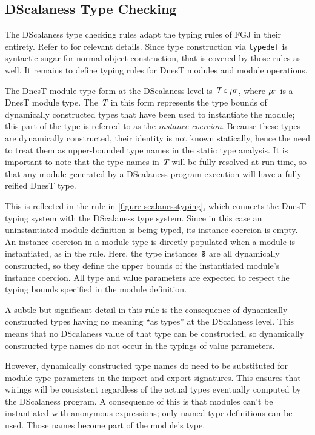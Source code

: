 \subsection{DScalaness Type Checking}
\label{section-scalaness-typing}

\scalanesstypingfig

The DScalaness type checking rules adapt the typing rules of FGJ in their entirety. Refer to
\cite{FJ} for relevant details. Since type construction via \texttt{typedef} is syntactic sugar
for normal object construction, that is covered by those rules as well. It remains to define
typing rules for DnesT modules and module operations.

The DnesT module type form at the DScalaness level is $\textit{T} \circ \mu\!\tau$, where
$\mu\!\tau$ is a DnesT module type. The $\textit{T}$ in this form represents the type bounds of
dynamically constructed types that have been used to instantiate the module; this part of the
type is referred to as the \emph{instance coercion}. Because these types are dynamically
constructed, their identity is not known statically, hence the need to treat them as
upper-bounded type names in the static type analysis. It is important to note that the type
names in $\textit{T}$ will be fully resolved at run time, so that any module generated by a
DScalaness program execution will have a fully reified DnesT type.

This is reflected in the  rule in \autoref{figure-scalanesstyping}, which connects
the DnesT typing system with the DScalaness type system. Since in this case an uninstantiated
module definition is being typed, its instance coercion is empty. An instance coercion in a
module type is directly populated when a module is instantiated, as in the 
rule. Here, the type instances ${\mathtt{\bar{s}}}$ are all dynamically constructed, so they define the
upper bounds of the instantiated module's instance coercion. All type and value parameters are
expected to respect the typing bounds specified in the module definition.

A subtle but significant detail in this rule is the consequence of dynamically constructed types
having no meaning ``as types'' at the DScalaness level. This means that no DScalaness value of
that type can be constructed, so dynamically constructed type names do not occur in the typings
of value parameters.

However, dynamically constructed type names do need to be substituted for module type parameters
in the import and export signatures. This ensures that wirings will be consistent regardless of
the actual types eventually computed by the DScalaness program. A consequence of this is that
modules can't be instantiated with anonymous expressions; only named type definitions can be
used. Those names become part of the module's type.

